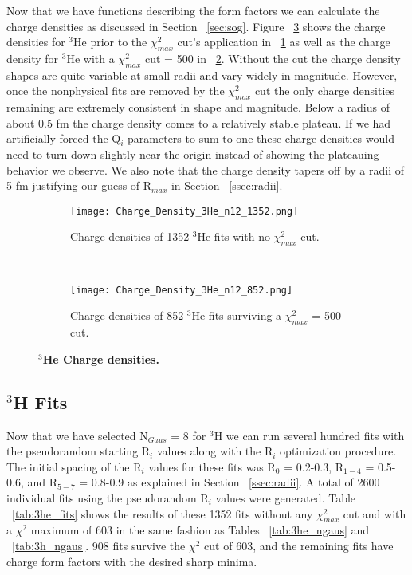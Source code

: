 Now that we have functions describing the form factors we can calculate the charge densities as discussed in Section ~\ref{sec:sog}. Figure ~\ref{fig:3he_charge_density} shows the charge densities for $^3$He prior to the $\chi^2_{max}$ cut's application in ~\ref{fig:3he_charge_density_no_cut} as well as the charge density for $^3$He with a $\chi^2_{max}$ cut = 500 in ~\ref{fig:3he_charge_density_cut}. Without the cut the charge density shapes are quite variable at small radii and vary widely in magnitude. However, once the nonphysical fits are removed by the $\chi^2_{max}$ cut the only charge densities remaining are extremely consistent in shape and magnitude. Below a radius of about 0.5 fm the charge density comes to a relatively stable plateau. If we had artificially forced the Q$_i$ parameters to sum to one these charge densities would need to turn down slightly near the origin instead of showing the plateauing behavior we observe. We also note that the charge density tapers off by a radii of 5 fm justifying our guess of R$_{max}$ in Section ~\ref{ssec:radii}.

\begin{figure}[!ht]
\begin{subfigure}{1.\textwidth}
  \centering
  \texttt{[image: Charge\_Density\_3He\_n12\_1352.png]}
  \caption{Charge densities of 1352 $^3$He fits with no $\chi^2_{max}$ cut.}
  \label{fig:3he_charge_density_no_cut}
\end{subfigure}\\
\begin{subfigure}{1.\textwidth}
  \centering
  \texttt{[image: Charge\_Density\_3He\_n12\_852.png]}
  \caption{Charge densities of 852 $^3$He fits surviving a $\chi^2_{max}$ = 500 cut.}
  \label{fig:3he_charge_density_cut}
\end{subfigure}
\caption{\bf{$^3$He Charge densities.}}
\label{fig:3he_charge_density}
\end{figure}

\subsection{$^3$H Fits}
\label{ssec:3h_fits}

Now that we have selected N$_{Gaus}$ = 8 for $^3$H we can run several hundred fits with the pseudorandom starting R$_i$ values along with the R$_i$ optimization procedure. The initial spacing of the R$_i$ values for these fits was R$_0$ = 0.2-0.3, R$_{1-4}$ = 0.5-0.6, and R$_{5-7}$ = 0.8-0.9 as explained in Section ~\ref{ssec:radii}. A total of 2600 individual fits using the pseudorandom R$_i$ values were generated. Table ~\ref{tab:3he_fits} shows the results of these 1352 fits without any $\chi^2_{max}$ cut and with a $\chi^2$ maximum of 603 in the same fashion as Tables ~\ref{tab:3he_ngaus} and ~\ref{tab:3h_ngaus}. 908 fits survive the $\chi^2$ cut of 603, and the remaining fits have charge form factors with the desired sharp minima.

